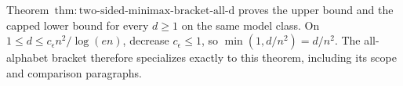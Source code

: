 Theorem~\(\mathrm{thm:two\text{-}sided\text{-}minimax\text{-}bracket\text{-}all\text{-}d}\) proves the upper bound and the capped lower bound for every \(d\ge1\) on the same model class.  On \(1\le d\le c_{\epsilon}n^2/\log(en)\), decrease \(c_{\epsilon}\le1\), so \(\min(1,d/n^2)=d/n^2\).  The all-alphabet bracket therefore specializes exactly to this theorem, including its scope and comparison paragraphs.